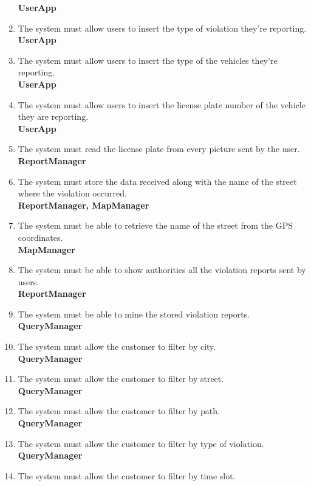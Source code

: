 \begin{enumerate}[label=\textbf{R\arabic*}]
		\textbf{UserApp}
		\item \label{req:violationType} The system must allow users to insert the type of violation they’re reporting.\\
		\textbf{UserApp}
		\item \label{req:vehicleType} The system must allow users to insert the type of the vehicles they’re reporting.\\
		\textbf{UserApp}
		\item \label{req:plateNumber} The system must allow users to insert the license plate number of the vehicle they are reporting.\\
		\textbf{UserApp}
		\item \label{req:readPlate} The system must read the license plate from every picture sent by the user.\\
		\textbf{ReportManager}
		\item \label{req:storeViolation} The system must store the data received along with the name of the street where the violation occurred.\\
		\textbf{ReportManager, MapManager}
		\item \label{req:streetName} The system must be able to retrieve the name of the street from the GPS coordinates.\\
		\textbf{MapManager}
		\item \label{req:notifyAuthority} The system must be able to show authorities all the violation reports sent by users.\\
		\textbf{ReportManager}
		\item \label{req:mineData} The system must be able to mine the stored violation reports.\\
		\textbf{QueryManager}
		\item \label{req:cityFilter} The system must allow the customer to filter by city.\\
		\textbf{QueryManager}
		\item \label{req:streetFilter} The system must allow the customer to filter by street.\\
		\textbf{QueryManager}
		\item \label{req:pathFilter} The system must allow the customer to filter by path.\\
		\textbf{QueryManager}
		\item \label{req:violationFilter} The system must allow the customer to filter by type of violation.\\
		\textbf{QueryManager}
		\item \label{req:timeFilter} The system must allow the customer to filter by time slot.\\

\end{enumerate}
